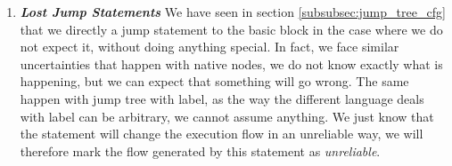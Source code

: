 \begin{enumerate}
	\item \textbf{\textit{Lost Jump Statements}} \newline 
	\label{subsubsec:lost_jump_statement}
	We have seen in section \ref{subsubsec:jump_tree_cfg} that we directly a jump statement to the basic block in the case where we do not expect it, without doing anything special.
	In fact, we face similar uncertainties that happen with native nodes, we do not know exactly what is happening, but we can expect that something will go wrong.
	The same happen with jump tree with label, as the way the different language deals with label can be arbitrary, we cannot assume anything.
	We just know that the statement will change the execution flow in an unreliable way, we will therefore mark the flow generated by this statement as \emph{unreliable}.
\end{enumerate}
